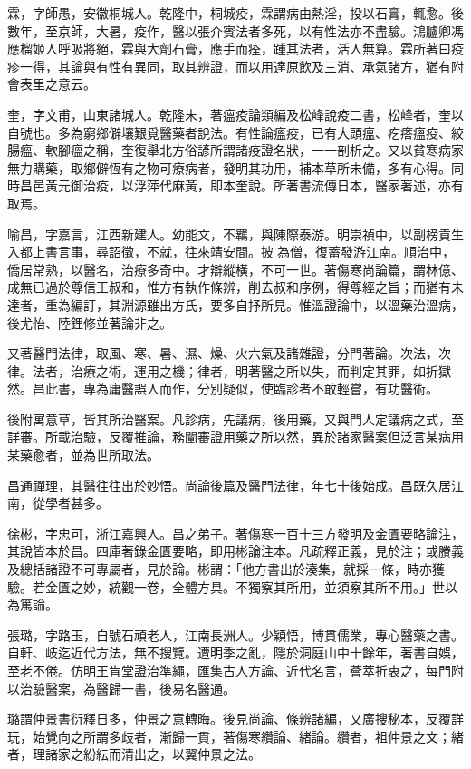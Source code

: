 \begin{pinyinscope}
霖，字師愚，安徽桐城人。乾隆中，桐城疫，霖謂病由熱淫，投以石膏，輒愈。後數年，至京師，大暑，疫作，醫以張介賓法者多死，以有性法亦不盡驗。鴻臚卿馮應榴姬人呼吸將絕，霖與大劑石膏，應手而痊，踵其法者，活人無算。霖所著曰疫疹一得，其論與有性有異同，取其辨證，而以用達原飲及三消、承氣諸方，猶有附會表里之意云。

奎，字文甫，山東諸城人。乾隆末，著瘟疫論類編及松峰說疫二書，松峰者，奎以自號也。多為窮鄉僻壤艱覓醫藥者說法。有性論瘟疫，已有大頭瘟、疙瘩瘟疫、絞腸瘟、軟腳瘟之稱，奎復舉北方俗諺所謂諸疫證名狀，一一剖析之。又以貧寒病家無力購藥，取鄉僻恆有之物可療病者，發明其功用，補本草所未備，多有心得。同時昌邑黃元御治疫，以浮萍代麻黃，即本奎說。所著書流傳日本，醫家著述，亦有取焉。

喻昌，字嘉言，江西新建人。幼能文，不羈，與陳際泰游。明崇禎中，以副榜貢生入都上書言事，尋詔徵，不就，往來靖安間。披為僧，復蓄發游江南。順治中，僑居常熟，以醫名，治療多奇中。才辯縱橫，不可一世。著傷寒尚論篇，謂林億、成無已過於尊信王叔和，惟方有執作條辨，削去叔和序例，得尊經之旨；而猶有未達者，重為編訂，其淵源雖出方氏，要多自抒所見。惟溫證論中，以溫藥治溫病，後尤怡、陸鋰修並著論非之。

又著醫門法律，取風、寒、暑、濕、燥、火六氣及諸雜證，分門著論。次法，次律。法者，治療之術，運用之機；律者，明著醫之所以失，而判定其罪，如折獄然。昌此書，專為庸醫誤人而作，分別疑似，使臨診者不敢輕嘗，有功醫術。

後附寓意草，皆其所治醫案。凡診病，先議病，後用藥，又與門人定議病之式，至詳審。所載治驗，反覆推論，務闡審證用藥之所以然，異於諸家醫案但泛言某病用某藥愈者，並為世所取法。

昌通禪理，其醫往往出於妙悟。尚論後篇及醫門法律，年七十後始成。昌既久居江南，從學者甚多。

徐彬，字忠可，浙江嘉興人。昌之弟子。著傷寒一百十三方發明及金匱要略論注，其說皆本於昌。四庫著錄金匱要略，即用彬論注本。凡疏釋正義，見於注；或賸義及總括諸證不可專屬者，見於論。彬謂：「他方書出於湊集，就採一條，時亦獲驗。若金匱之妙，統觀一卷，全體方具。不獨察其所用，並須察其所不用。」世以為篤論。

張璐，字路玉，自號石頑老人，江南長洲人。少穎悟，博貫儒業，專心醫藥之書。自軒、岐迄近代方法，無不搜覽。遭明季之亂，隱於洞庭山中十餘年，著書自娛，至老不倦。仿明王肯堂證治準繩，匯集古人方論、近代名言，薈萃折衷之，每門附以治驗醫案，為醫歸一書，後易名醫通。

璐謂仲景書衍釋日多，仲景之意轉晦。後見尚論、條辨諸編，又廣搜秘本，反覆詳玩，始覺向之所謂多歧者，漸歸一貫，著傷寒纘論、緒論。纘者，祖仲景之文；緒者，理諸家之紛紜而清出之，以翼仲景之法。


\end{pinyinscope}
